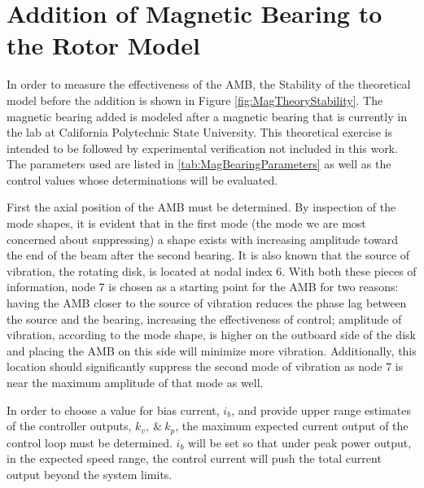 \section{Addition of Magnetic Bearing to the Rotor Model}
In order to measure the effectiveness of the AMB, the Stability of the theoretical model before the addition is shown in Figure \ref{fig:MagTheoryStability}. The magnetic bearing added is modeled after a magnetic bearing that is currently in the lab at California Polytechnic State University. This theoretical exercise is intended to be followed by experimental verification not included in this work. The parameters used are listed in \ref{tab:MagBearingParameters} as well as the control values whose determinations will be evaluated.\par 
First the axial position of the AMB must be determined. By inspection of the mode shapes, it is evident that in the first mode (the mode we are most concerned about suppressing) a shape exists with increasing amplitude toward the end of the beam after the second bearing. It is also known that the source of vibration, the rotating disk, is located at nodal index 6. With both these pieces of information, node 7 is chosen as a starting point for the AMB for two reasons: having the AMB closer to the source of vibration reduces the phase lag between the source and the bearing, increasing the effectiveness of control; amplitude of vibration, according to the mode shape, is higher on the outboard side of the disk and placing the AMB on this side will minimize more vibration. Additionally, this location should significantly suppress the second mode of vibration as node 7 is near the maximum amplitude of that mode as well.\par 
In order to choose a value for bias current, $ i_b $, and provide upper range estimates of the controller outputs, $ k_v,\ \&\ k_p $, the maximum expected current output of the control loop must be determined. $ i_b $ will be set so that under peak power output, in the expected speed range, the control current will push the total current output beyond the system limits.\par 
